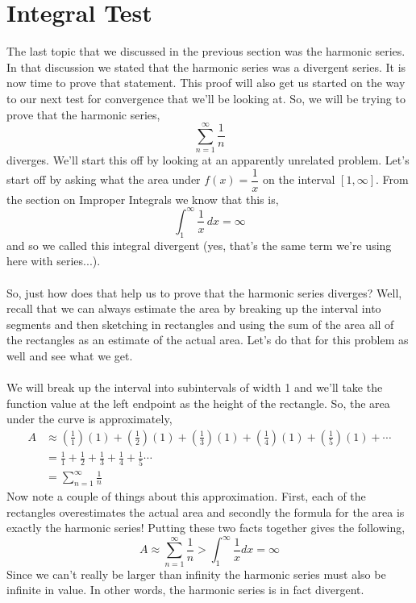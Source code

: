 \documentclass[10pt,reqno]{book}
\theoremstyle{definition}
\begin{document}
	\section{Integral Test}
	
	The last topic that we discussed in the previous section was the harmonic series.  In that discussion we stated that the harmonic series was a divergent series. It is now time to prove that statement. This proof will also get us started on the way to our next test for convergence that we'll be looking at.
	So, we will be trying to prove that the harmonic series,
	\[ \sum\limits_{n=1}^{\infty} \frac{1}{n} \]
	diverges. We'll start this off by looking at an apparently unrelated problem.  Let's start off by asking what the area under $ f(x) = \dfrac{1}{x} $ on the interval $ [1,\infty] $. From the section on Improper Integrals we know that this is,
	\[ \int_{1}^{\infty} \frac{1}{x}\,dx = \infty \]
	and so we called this integral divergent (yes, that's the same term we're using here with series...).\\ \\
	So, just how does that help us to prove that the harmonic series diverges? Well, recall that we can always estimate the area by breaking up the interval into segments and then sketching in rectangles and using the sum of the area all of the rectangles as an estimate of the actual area. Let's do that for this problem as well and see what we get.\\ \\
	We will break up the interval into subintervals of width 1 and we'll take the function value at the left endpoint as the height of the rectangle. So, the area under the curve is approximately,
	\begin{align*}
		A &\approx \left( \frac{1}{1} \right) (1) + \left( \frac{1}{2} \right) (1) + \left( \frac{1}{3} \right) (1) + \left( \frac{1}{4} \right) (1) + \left( \frac{1}{5} \right) (1) + \cdots\\
		&= \frac{1}{1} + \frac{1}{2} + \frac{1}{3} + \frac{1}{4} + \frac{1}{5} \cdots\\
		&= \sum\limits_{n=1}^{\infty} \frac{1}{n}
	\end{align*}
	Now note a couple of things about this approximation. First, each of the rectangles overestimates the actual area and secondly the formula for the area is exactly the harmonic series! Putting these two facts together gives the following,
	\[ A \approx \sum\limits_{n=1}^{\infty} \frac{1}{n} > \int_{1}^{\infty} \frac{1}{x} dx = \infty \]
	Since we can't really be larger than infinity the harmonic series must also be infinite in value. In other words, the harmonic series is in fact divergent.\\ \\
\end{document}
